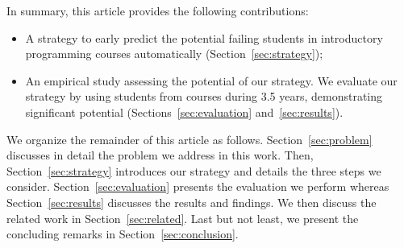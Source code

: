 In summary, this article provides the following contributions:

\begin{itemize}

	\item A strategy to early predict the potential failing students in introductory programming courses automatically (Section~\ref{sec:strategy});
	
	\item An empirical study assessing the potential of our strategy. We evaluate our strategy by using \totalStudents students from \semesters courses during 3.5 years, demonstrating significant potential (Sections~\ref{sec:evaluation} and~\ref{sec:results}).

\end{itemize}

We organize the remainder of this article as follows. Section~\ref{sec:problem} discusses in detail the problem we address in this work. Then, Section~\ref{sec:strategy} introduces our strategy and details the three steps we consider. Section~\ref{sec:evaluation} presents the evaluation we perform whereas Section~\ref{sec:results} discusses the results and findings. We then discuss the related work in Section~\ref{sec:related}. Last but not least, we present the concluding remarks in Section~\ref{sec:conclusion}.